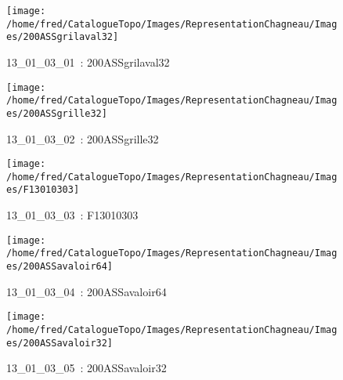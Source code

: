 \documentclass[12pt,titlepage,oneside]{book}
\begin{document}
\begin{figure}[h!]
  \hfill         %
  \begin{minipage}[t]{3cm}
    \begin{center}
      \texttt{[image: /home/fred/CatalogueTopo/Images/RepresentationChagneau/Images/200ASSgrilaval32]}
      \caption[~13\_01\_03\_01]{\small{13\_01\_03\_01~:} \tiny{200ASSgrilaval32}}\label{200ASSgrilaval32}
    \end{center}
  \end{minipage}
  \begin{minipage}[t]{3cm}
    \begin{center}
      \texttt{[image: /home/fred/CatalogueTopo/Images/RepresentationChagneau/Images/200ASSgrille32]}
      \caption[~13\_01\_03\_02]{\small{13\_01\_03\_02~:} \tiny{200ASSgrille32}}\label{200ASSgrille32}
    \end{center}
  \end{minipage}
  \begin{minipage}[t]{3cm}
    \begin{center}
      \texttt{[image: /home/fred/CatalogueTopo/Images/RepresentationChagneau/Images/F13010303]}
      \caption[~13\_01\_03\_03]{\small{13\_01\_03\_03~:} \tiny{F13010303}}\label{F13010303}
    \end{center}
  \end{minipage}
  \begin{minipage}[t]{3cm}
    \begin{center}
      \texttt{[image: /home/fred/CatalogueTopo/Images/RepresentationChagneau/Images/200ASSavaloir64]}
      \caption[~13\_01\_03\_04]{\small{13\_01\_03\_04~:} \tiny{200ASSavaloir64}}\label{200ASSavaloir64}
    \end{center}
  \end{minipage}
  \begin{minipage}[t]{3cm}
    \begin{center}
      \texttt{[image: /home/fred/CatalogueTopo/Images/RepresentationChagneau/Images/200ASSavaloir32]}
      \caption[~13\_01\_03\_05]{\small{13\_01\_03\_05~:} \tiny{200ASSavaloir32}}\label{200ASSavaloir32}
    \end{center}
  \end{minipage}

\end{figure}
\end{document}
